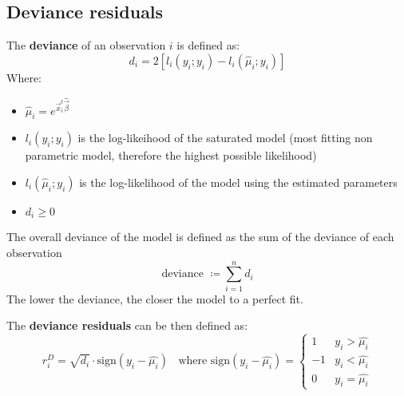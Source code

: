     \subsection{Deviance residuals}
      The \textbf{deviance} of an observation $i$ is defined as:
        $$d_i = 2[l_i(y_i; y_i) - l_i(\hat{\mu}_i; y_i)]$$
      Where:
      \begin{itemize}
        \item $\hat{\mu}_i = e^{\vec{x}_i^t\hat{\vec{\beta}}}$
        \item $l_i(y_i; y_i)$ is the log-likeihood of the saturated model (most fitting non parametric model, therefore the highest possible likelihood)
        \item $l_i(\hat{\mu}_i; y_i)$ is the log-likelihood of the model using the estimated parameters
        \item $d_i \geq 0$ 
      \end{itemize}
      The overall deviance of the model is defined as the sum of the deviance of each observation
      $$\text{deviance } \coloneqq \sum_{i = 1}^n d_i$$
      The lower the deviance, the closer the model to a perfect fit.
      
      The \textbf{deviance residuals} can be then defined as:
      $$r_i^D = \sqrt{d_i} \cdot \text{sign}(y_i - \hat{\mu_i})\;\;
      \text{ where sign}(y_i - \hat{\mu_i}) = 
      \begin{cases}
        1  & y_i>\hat{\mu_i} \\
        -1 & y_i<\hat{\mu_i} \\
        0  & y_i=\hat{\mu_i}
      \end{cases}
      $$
